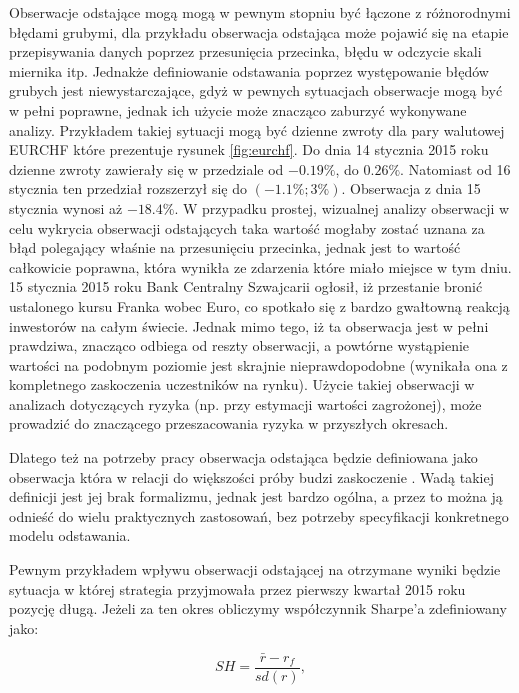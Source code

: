 \documentclass[a4paper,12pt,openany, DIV=calc, headsepline]{scrbook}
\begin{document}
Obserwacje odstające mogą mogą w pewnym stopniu być łączone z różnorodnymi błędami grubymi, dla przykładu obserwacja odstająca może pojawić się na etapie przepisywania danych poprzez przesunięcia przecinka, błędu w odczycie skali miernika itp. Jednakże definiowanie odstawania poprzez występowanie błędów grubych jest niewystarczające, gdyż w pewnych sytuacjach obserwacje mogą być w pełni poprawne, jednak ich użycie może znacząco zaburzyć wykonywane analizy. Przykładem takiej sytuacji mogą być dzienne zwroty dla pary walutowej EURCHF które prezentuje rysunek \ref{fig:eurchf}. Do dnia 14 stycznia 2015 roku dzienne zwroty zawierały się w przedziale od $-0.19\%$, do $0.26\%$. Natomiast od 16 stycznia ten przedział rozszerzył się do $(-1.1 \%; 3\%)$. Obserwacja z dnia 15 stycznia wynosi aż $-18.4\%$. W przypadku prostej, wizualnej analizy obserwacji w celu wykrycia obserwacji odstających taka wartość mogłaby zostać uznana za błąd polegający właśnie na przesunięciu przecinka, jednak jest to wartość całkowicie poprawna, która wynikła ze zdarzenia które miało miejsce w tym dniu. 15 stycznia 2015 roku Bank Centralny Szwajcarii ogłosił, iż przestanie bronić ustalonego kursu Franka wobec Euro, co spotkało się z bardzo gwałtowną reakcją inwestorów na całym świecie. Jednak mimo tego, iż ta obserwacja jest w pełni prawdziwa, znacząco odbiega od reszty obserwacji, a powtórne wystąpienie wartości na podobnym poziomie jest skrajnie nieprawdopodobne (wynikała ona z kompletnego zaskoczenia uczestników na rynku). Użycie takiej obserwacji w analizach dotyczących ryzyka (np. przy estymacji wartości zagrożonej), może prowadzić do znaczącego przeszacowania ryzyka w przyszłych okresach.

Dlatego też na potrzeby pracy obserwacja odstająca będzie definiowana jako obserwacja która w relacji do większości próby budzi zaskoczenie \citep{Ripley2004}. Wadą takiej definicji jest jej brak formalizmu, jednak jest bardzo ogólna, a przez to można ją odnieść do wielu praktycznych zastosowań, bez potrzeby specyfikacji konkretnego modelu odstawania.

Pewnym przykładem wpływu obserwacji odstającej na otrzymane wyniki będzie sytuacja w której strategia przyjmowała przez pierwszy kwartał 2015 roku pozycję długą. Jeżeli za ten okres obliczymy współczynnik Sharpe'a zdefiniowany jako:

\begin{equation}
\label{eq:sharpe}
SH = \frac{\bar{r} - r_f}{sd(r)},
\end{equation}
\end{document}
